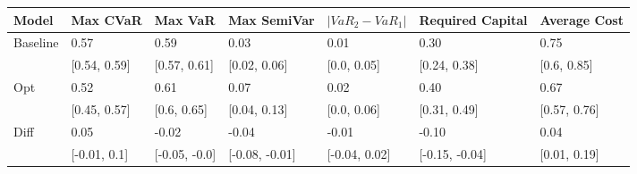 \begin{tabular}{lllllll}
\toprule
   Model &     Max CVaR &       Max VaR &    Max SemiVar & $|VaR_2 - VaR_1|$ & Required Capital & Average Cost \\
\midrule
Baseline &         0.57 &          0.59 &           0.03 &              0.01 &             0.30 &         0.75 \\
         & [0.54, 0.59] &  [0.57, 0.61] &   [0.02, 0.06] &       [0.0, 0.05] &     [0.24, 0.38] &  [0.6, 0.85] \\
     Opt &         0.52 &          0.61 &           0.07 &              0.02 &             0.40 &         0.67 \\
         & [0.45, 0.57] &   [0.6, 0.65] &   [0.04, 0.13] &       [0.0, 0.06] &     [0.31, 0.49] & [0.57, 0.76] \\
    Diff &         0.05 &         -0.02 &          -0.04 &             -0.01 &            -0.10 &         0.04 \\
         & [-0.01, 0.1] & [-0.05, -0.0] & [-0.08, -0.01] &     [-0.04, 0.02] &   [-0.15, -0.04] & [0.01, 0.19] \\
\bottomrule
\end{tabular}
